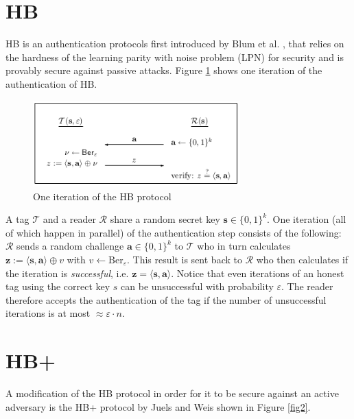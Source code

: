 \documentclass[11pt,a4paper]{article}
\begin{document}
\newcommand{\N}{\mathbb{N}}
\newcommand{\R}{\mathbb{R}}
\newcommand{\Z}{\mathbb{Z}}
\newcommand{\e}{\varepsilon}
\newcommand{\bb}[1]{\boldsymbol{#1}}

\section{HB}

HB is an authentication protocols first introduced by Blum et al. \cite{10.1007/3-540-45682-1_4}, \cite{10.1007/3-540-48329-2_24} that relies on the hardness of the learning parity with noise problem (LPN) for security and is provably secure against passive attacks. Figure \ref{fig1} shows one iteration of the authentication of HB.

\begin{figure}[h]
	\includegraphics[width=8cm]{hb}
	\centering
	\caption{One iteration of the HB protocol}
	\label{fig1}
\end{figure}

A tag $\mathcal{T}$ and a reader $\mathcal{R}$ share a random secret key $\bb{s} \in \{0,1\}^k$. One iteration (all of which happen in parallel) of the authentication step consists of the following:
$\mathcal{R}$ sends a random challenge $\bb{a} \in \{0,1\}^k$ to $\mathcal{T}$ who in turn calculates $\bb{z}:= \langle \bb{s}, \bb{a} \rangle \oplus v$ with $v \leftarrow \text{Ber}_\e$.
This result is sent back to $\mathcal{R}$ who then calculates if the iteration is \textit{successful}, i.e. $\bb{z} = \langle \bb{s}, \bb{a} \rangle $. Notice that even iterations of an honest tag using the correct key $s$ can be unsuccessful with probability $\e$. The reader therefore accepts the authentication of the tag if the number of unsuccessful iterations is at most $\approx \e \cdot n$.

\section{HB+}

A modification of the HB protocol in order for it to be secure against an active adversary is the HB+ protocol by Juels and Weis \cite{juels2005authenticating} shown in Figure \ref{fig2}.
\end{document}
